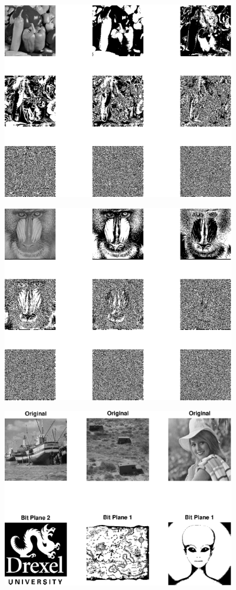 \documentclass{article}
\begin{document}
\includegraphics [width=4in]{lab3_01.eps}

\includegraphics [width=4in]{lab3_02.eps}

\includegraphics [width=4in]{lab3_03.eps}
\end{document}
